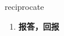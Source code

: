 
\begin{frame}
{\huge reciprocate}
\begin{center}
\begin{enumerate}\Large
  \item \textbf{报答，回报}
\end{enumerate}
\end{center}
\end{frame}
